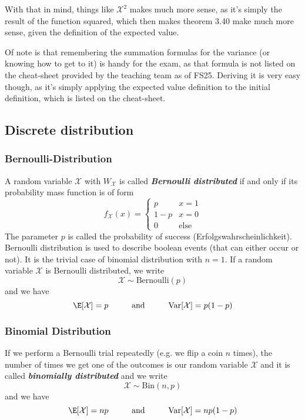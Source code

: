 With that in mind, things like $\mathcal{X}^2$ makes much more sense, as it's simply the result of the function squared, which then makes theorem 3.40 make much more sense, given the definition of the expected value.

Of note is that remembering the summation formulas for the variance (or knowing how to get to it) is handy for the exam, as that formula is not listed on the cheat-sheet provided by the teaching team as of FS25. 
Deriving it is very easy though, as it's simply applying the expected value definition to the initial definition, which is listed on the cheat-sheet.


\newpage
\subsection{Discrete distribution}
\subsubsection{Bernoulli-Distribution}
A random variable $\mathcal{X}$ with $W_{\mathcal{X}}$ is called \textit{\textbf{Bernoulli distributed}} if and only if its probability mass function is of form
\[
    f_{\mathcal{X}}(x) = \begin{cases}
        p     & x = 1       \\
        1 - p & x = 0       \\
        0     & \text{else}
    \end{cases}
\]
The parameter $p$ is called the probability of success (Erfolgswahrscheinlichkeit). Bernoulli distribution is used to describe boolean events (that can either occur or not). It is the trivial case of binomial distribution with $n = 1$. If a random variable $\mathcal{X}$ is Bernoulli distributed, we write
\[
    \mathcal{X} \sim \text{Bernoulli}(p)
\]
and we have
\[
    \E[\mathcal{X}] = p \hspace{1cm} \text{and} \hspace{1cm} \text{Var}[\mathcal{X}] = p(1 - p)
\]

\subsubsection{Binomial Distribution}
If we perform a Bernoulli trial repeatedly (e.g. we flip a coin $n$ times), the number of times we get one of the outcomes is our random variable $\mathcal{X}$ and it is called \textbf{\textit{binomially distributed}} and we write
\[
    \mathcal{X} \sim \text{Bin}(n, p)
\]
and we have
\[
    \E[\mathcal{X}] = np \hspace{1cm} \text{and} \hspace{1cm} \text{Var}[\mathcal{X}] = np(1 - p)
\]



